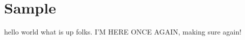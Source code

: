\documentclass{book}
\begin{document}
\chapter{Sample}
 hello world what is up folks. I'M HERE ONCE AGAIN, making sure again!
\lipsum[1-4]
\end{document}
